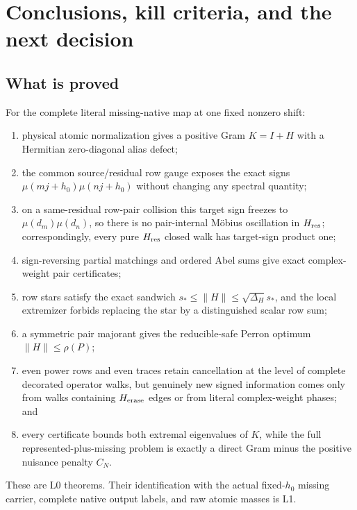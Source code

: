 \section{Conclusions, kill criteria, and the next decision}
\label{sec:tpc68-claim-boundary}

\subsection{What is proved}

For the complete literal missing-native map at one fixed nonzero shift:
\begin{enumerate}[label=\textup{(\arabic*)},leftmargin=3em]
 \item physical atomic normalization gives a positive Gram \(K=I+H\)
       with a Hermitian zero-diagonal alias defect;
 \item the common source/residual row gauge exposes the exact signs
       \(\mu(mj+h_0)\mu(nj+h_0)\) without changing any spectral quantity;
 \item on a same-residual row-pair collision this target sign freezes to
       \(\mu(d_m)\mu(d_n)\), so there is no pair-internal M\"obius
       oscillation in \(H_{\rm res}\); correspondingly, every pure
       \(H_{\rm res}\) closed walk has target-sign product one;
 \item sign-reversing partial matchings and ordered Abel sums give exact
       complex-weight pair certificates;
 \item row stars satisfy the exact sandwich
       \(s_*\le\|H\|\le\sqrt{\Delta_H}s_*\), and the local extremizer
       forbids replacing the star by a distinguished scalar row sum;
 \item a symmetric pair majorant gives the reducible-safe Perron optimum
       \(\|H\|\le\rho(P)\);
 \item even power rows and even traces retain cancellation at the level of
       complete decorated operator walks, but genuinely new signed
       information comes only from walks containing \(H_{\rm erase}\)
       edges or from literal complex-weight phases; and
 \item every certificate bounds both extremal eigenvalues of \(K\), while
       the full represented-plus-missing problem is exactly a direct Gram
       minus the positive nuisance penalty \(C_N\).
\end{enumerate}
These are L0 theorems.  Their identification with the actual fixed-\(h_0\)
missing carrier, complete native output labels, and raw atomic masses is
L1.

